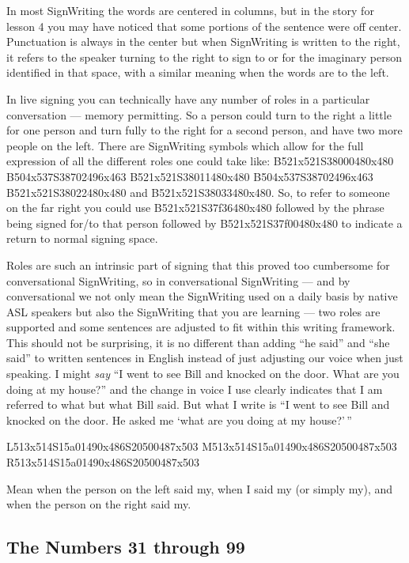 \documentclass{article}
\begin{document}
In most SignWriting the words are centered in columns, but in the story for lesson 4 you may have noticed that some portions of the sentence were off center.
Punctuation is always in the center but when SignWriting is written to the right, it refers to the speaker turning to the right to sign to or for the imaginary person identified in that space, with a similar meaning when the words are to the left.

In live signing you can technically have any number of roles in a particular conversation --- memory permitting.
So a person could turn to the right a little for one person and turn fully to the right for a second person, and have two more people on the left.
There are SignWriting symbols which allow for the full expression of all the different roles one could take like: B521x521S38000480x480 B504x537S38702496x463 B521x521S38011480x480 B504x537S38702496x463 B521x521S38022480x480 and B521x521S38033480x480.
So, to refer to someone on the far right you could use B521x521S37f36480x480 followed by the phrase being signed for/to that person followed by B521x521S37f00480x480 to indicate a return to normal signing space.

Roles are such an intrinsic part of signing that this proved too cumbersome for conversational SignWriting, so in conversational SignWriting --- and by conversational we not only mean the SignWriting used on a daily basis by native ASL speakers but also the SignWriting that you are learning --- two roles are supported and some sentences are adjusted to fit within this writing framework.
This should not be surprising, it is no different than adding ``he said'' and ``she said'' to written sentences in English instead of just adjusting our voice when just speaking.
I might \emph{say} ``I went to see Bill and knocked on the door. What are you doing at my house?'' and the change in voice I use clearly indicates that I am referred to what but what Bill said.
But what I write is ``I went to see Bill and knocked on the door. He asked me `what are you doing at my house?'\,''

\begin{center}
L513x514S15a01490x486S20500487x503
M513x514S15a01490x486S20500487x503
R513x514S15a01490x486S20500487x503
\end{center}

Mean when the person on the left said my, when I said my (or simply my), and when the person on the right said my.

\subsection{The Numbers 31 through 99}
\end{document}
